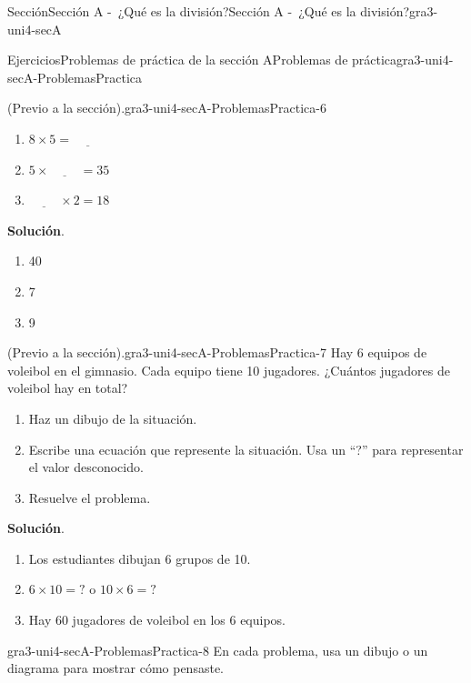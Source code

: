 \documentclass[oneside,10pt,]{article}
\newcommand{\blocktitlefont}{\relax}
\begin{document}
\begin{sectionptx}{Sección}{Sección A -~¿Qué es la división?}{}{Sección A -~¿Qué es la división?}{}{}{gra3-uni4-secA}
\begin{exercises-subsection}{Ejercicios}{Problemas de práctica de la sección A}{}{Problemas de práctica}{}{}{gra3-uni4-secA-ProblemasPractica}
\begin{divisionexercise}{4}{(Previo a la sección).}{}{gra3-uni4-secA-ProblemasPractica-6}
\begin{enumerate}[label={(\alph*)}]
\item{}\(\displaystyle 8 \times 5 = \underline{\hspace{1cm}}\)%
\item{}\(\displaystyle 5 \times \underline{\hspace{1cm}} = 35\)%
\item{}\(\displaystyle \underline{\hspace{1cm}} \times 2 = 18\)%
\end{enumerate}
%
\par\smallskip%
\noindent\textbf{\blocktitlefont Solución}.\hypertarget{gra3-uni4-secA-ProblemasPractica-6-3}{}\quad{}%
\begin{enumerate}[label={(\alph*)}]
\item{}40%
\item{}7%
\item{}9%
\end{enumerate}
\end{divisionexercise}%
\begin{divisionexercise}{5}{(Previo a la sección).}{}{gra3-uni4-secA-ProblemasPractica-7}%
Hay 6 equipos de voleibol en el gimnasio. Cada equipo tiene 10 jugadores. ¿Cuántos jugadores de voleibol hay en total?%
\par
%
\begin{enumerate}[label={(\alph*)}]
\item{}Haz un dibujo de la situación.%
\item{}Escribe una ecuación que represente la situación. Usa un “?” para representar el valor desconocido.%
\item{}Resuelve el problema.%
\end{enumerate}
%
\par\smallskip%
\noindent\textbf{\blocktitlefont Solución}.\hypertarget{gra3-uni4-secA-ProblemasPractica-7-3}{}\quad{}%
\begin{enumerate}[label={(\alph*)}]
\item{}Los estudiantes dibujan 6 grupos de 10.%
\item{}\(6 \times 10 = {?}\) o \(10 \times 6 = {?}\)%
\item{}Hay 60 jugadores de voleibol en los 6 equipos.%
\end{enumerate}
\end{divisionexercise}%
\begin{divisionexercise}{6}{}{}{gra3-uni4-secA-ProblemasPractica-8}%
En cada problema, usa un dibujo o un diagrama para mostrar cómo pensaste.%
\par
%
\begin{enumerate}[label={(\alph*)}]

\end{enumerate}
\end{divisionexercise}
\end{exercises-subsection}
\end{sectionptx}
\end{document}
